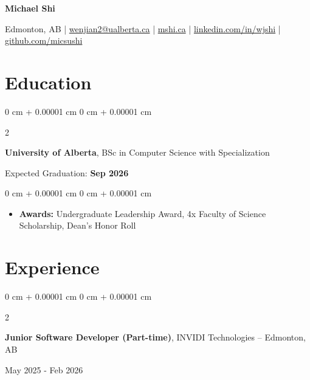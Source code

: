 \documentclass[10pt, letterpaper]{article}
\newenvironment{onecolentry}{
    \begin{adjustwidth}{
        0 cm + 0.00001 cm
    }{
        0 cm + 0.00001 cm
    }
}{
    \end{adjustwidth}
}
\newenvironment{twocolentry}[2][]{
    \onecolentry
    \def\secondColumn{#2}
    \setcolumnwidth{\fill, 6 cm}
    \begin{paracol}{2}
}{
    \switchcolumn \raggedleft \secondColumn
    \end{paracol}
    \endonecolentry
}
\begin{document}
    \begin{center}
        {\fontsize{24pt}{24pt}\selectfont\textbf{Michael Shi}}

        \vspace{0.2cm}

        Edmonton, AB | \href{mailto:wenjian2@ualberta.ca}{wenjian2@ualberta.ca} | \href{https://mshi.ca}{mshi.ca} | \href{https://linkedin.com/in/wjshi}{linkedin.com/in/wjshi} | \href{https://github.com/micsushi}{github.com/micsushi}
    \end{center}

    \vspace{0.10 cm}
    \section{Education}

    \begin{twocolentry}{Expected Graduation: \textbf{Sep 2026}}
        \textbf{University of Alberta}, BSc in Computer Science with Specialization
    \end{twocolentry}

    \vspace{0.10 cm}
    \begin{onecolentry}
        \begin{itemize}[leftmargin=2em, itemsep=1pt, parsep=0pt, topsep=0pt, partopsep=0pt]
            \item \textbf{Awards:} Undergraduate Leadership Award, 4x Faculty of Science Scholarship, Dean's Honor Roll
        \end{itemize}
    \end{onecolentry}

    \vspace{0.10 cm}
    \section{Experience}


    \begin{twocolentry}{May 2025 - Feb 2026}
        \textbf{Junior Software Developer (Part-time)}, INVIDI Technologies -- Edmonton, AB
    \end{twocolentry}
\end{document}

